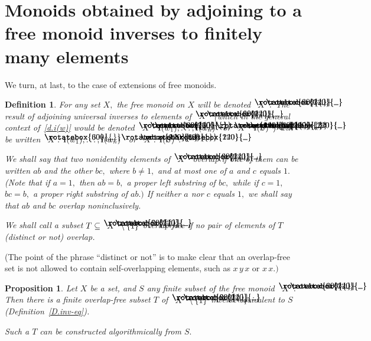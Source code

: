 \documentclass{amsart}
\newtheorem{proposition}[equation]{Proposition}
\newtheorem{definition}[equation]{Definition}
\numberwithin{equation}{section}
\newcommand{\I}{\mathbf{i}\hspace{.05em}}
\newcommand{\langl}{\begin{picture}(.51em,1em)
\put(.11em,.33em){\rotatebox{60}{\line(1,0){.55em}}}
\put(.11em,.33em){\rotatebox{300}{\line(1,0){.55em}}}
\end{picture}}
\newcommand{\rangl}{\begin{picture}(.5em,1em)
\put(.09em,.33em){\rotatebox{120}{\line(1,0){.55em}}}
\put(.09em,.33em){\rotatebox{240}{\line(1,0){.55em}}}
\end{picture}}
\begin{document}
\section{Monoids obtained by adjoining to a
free monoid inverses to finitely many elements}\label{S.main}

We turn, at last, to the case of extensions of free monoids.

\begin{definition}\label{D.main}
For any set $X,$ the free monoid on $X$ will be
denoted $\langl X\rangl.$
The result of adjoining universal inverses to
elements of $\langl X\rangl$ {\rm(}which
in the general context of~\eqref{d.i(w)} would be denoted
$\langl X\rangl\langl\I(w_1),\dots,\I(w_n)\rangl$
or $\langl X\rangl\langl\I(S)\rangl)$ will be
written $\langl X:\,\I(w_1),\dots,\I(w_n)\rangl$ or
$\langl X:\,\I(S)\rangl.$

We shall say that two nonidentity elements of $\langl X\rangl$
{\em overlap} if one of them can be written $ab$ and the other $bc,$
where $b\neq 1,$ and at most one of $a$ and $c$ equals $1.$
{\rm(}Note that if $a = 1,$
then $ab=b,$ a proper left substring of $bc,$ while
if $c = 1,$ $bc=b,$ a proper right substring of $ab.)$
If neither $a$ nor $c$ equals $1,$ we shall say that $ab$ and $bc$
{\em overlap noninclusively}.

We shall call a subset $T\subseteq \langl X\rangl\setminus\{1\}$
{\em overlap-free} if no pair of elements of $T$
{\rm(}distinct or not{\rm)} overlap.
\end{definition}

(The point of the phrase ``distinct or not'' is to make clear
that an overlap-free set is not allowed to contain
self-overlapping elements, such as $x\,y\,x$ or $x\,x.)$

\begin{proposition}\label{P.oE_T}
Let $X$ be a set, and $S$ any finite subset of the free monoid
$\langl X\rangl.$
Then there is a finite overlap-free
subset $T$ of $\langl X\rangl\setminus\{1\}$
inverse-equivalent to $S$ {\rm(}Definition~\ref{D.inv-eq}{\rm)}.

Such a $T$ can be constructed algorithmically from $S.$
\end{proposition}
\end{document}
